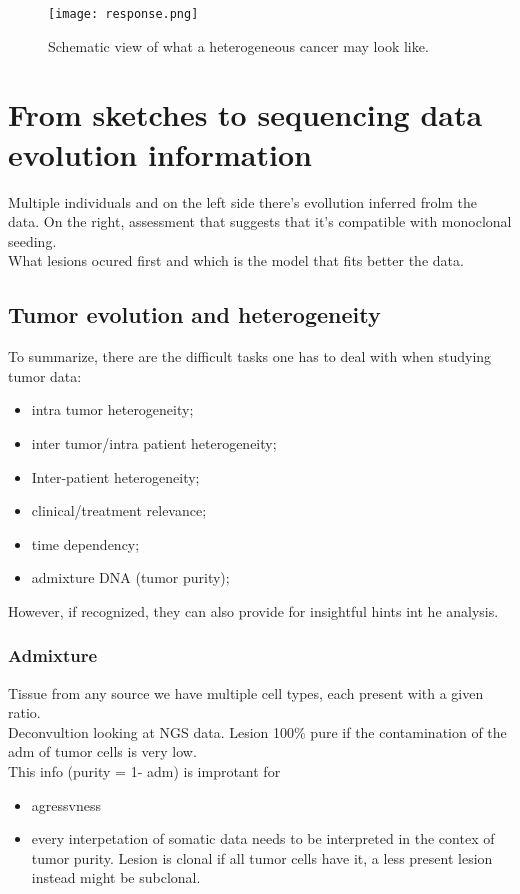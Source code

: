 \begin{figure}[H]
	\centering
	\texttt{[image: response.png]}
	\caption{\label{fig:response} Schematic view of what a heterogeneous cancer may look like.}
\end{figure}

\section{From sketches to sequencing data evolution information}
Multiple individuals and on the left side there's evollution inferred frolm the data. On the right, assessment that suggests that it's compatible with monoclonal seeding. \\
What lesions ocured first and which is the model that fits better the data.\\

\subsection{Tumor evolution and heterogeneity}
To summarize, there are the difficult tasks one has to deal with when studying tumor data:
\begin{itemize}
\item intra tumor heterogeneity;
\item inter tumor/intra patient heterogeneity;
\item Inter-patient heterogeneity;
\item clinical/treatment relevance;
\item time dependency;
\item admixture DNA (tumor purity);
\end{itemize}

However, if recognized, they can also provide for insightful hints int he analysis.\\

\subsubsection{Admixture}
Tissue from any source we have multiple cell types, each present with a given ratio.\\
Deconvultion looking at NGS data. Lesion 100\% pure if the contamination of the adm of tumor cells is very low. \\
This info (purity = 1- adm) is improtant for
\begin{itemize}
\item agressvness
\item every interpetation of somatic data needs to be interpreted in the contex of tumor purity. Lesion is clonal if all tumor cells have it, a less present lesion instead might be subclonal.
\end{itemize}

